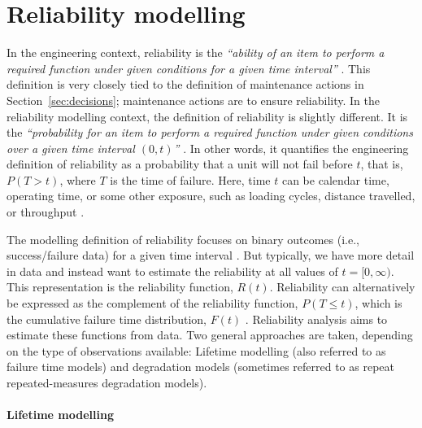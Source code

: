 \section{Reliability modelling}
\label{sec:reliability}

In the engineering context, reliability is the \textit{``ability of an item to perform a required function under given conditions for a given time interval''} \citep{ISO_14224_2016}. This definition is very closely tied to the definition of maintenance actions in Section~\ref{sec:decisions}; maintenance actions are to ensure reliability. In the reliability modelling context, the definition of reliability is slightly different. It is the \textit{``probability for an item to perform a required function under given conditions over a given time interval $(0, t)$''} \citep{ISO_12489_2013}. In other words, it quantifies the engineering definition of reliability as a probability that a unit will not fail before $t$, that is, $P(T > t)$, where $T$ is the time of failure. Here, time $t$ can be calendar time, operating time, or some other exposure, such as loading cycles, distance travelled, or throughput \citep{lee2006}.

The modelling definition of reliability focuses on binary outcomes (i.e., success/failure data) for a given time interval \citep{hamada2008}. But typically, we have more detail in data and instead want to estimate the reliability at all values of $t = [0, \infty)$. This representation is the reliability function, $R(t)$. Reliability can alternatively be expressed as the complement of the reliability function, $P(T \le t)$, which is the cumulative failure time distribution, $F(t)$ \citep{Meeker2022}. Reliability analysis aims to estimate these functions from data. Two general approaches are taken, depending on the type of observations available: Lifetime modelling (also referred to as failure time models) and degradation models (sometimes referred to as repeat repeated-measures degradation models).

\paragraph*{Lifetime modelling} 

